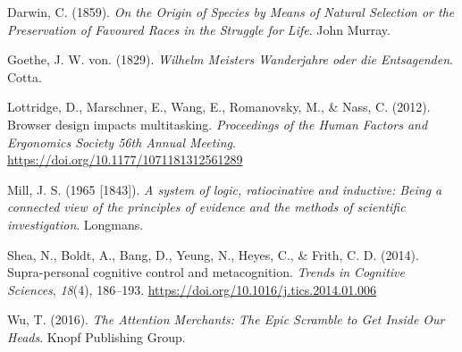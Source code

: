 \documentclass[a4paper, nobind]{templates/ociamthesis}
\newlength{\cslhangindent}
\newenvironment{CSLReferences}[2] %
 {%
  \setlength{\parindent}{0pt}
  \ifodd #1
  \let\oldpar\par
  \def\par{\hangindent=\cslhangindent\oldpar}
  \fi
  \setlength{\parskip}{1mm}
  \setlength{\baselineskip}{6mm}
 }%
 {}
\begin{document}
\hypertarget{refs}{}
\begin{CSLReferences}{1}{0}
\leavevmode{}%
Darwin, C. (1859). \emph{{On the Origin of Species by Means of Natural Selection or the Preservation of Favoured Races in the Struggle for Life}}. John Murray.

\leavevmode{}%
Goethe, J. W. von. (1829). \emph{Wilhelm {Meisters} {Wanderjahre} oder die {Entsagenden}}. Cotta.

\leavevmode{}%
Lottridge, D., Marschner, E., Wang, E., Romanovsky, M., \& Nass, C. (2012). {Browser design impacts multitasking}. \emph{Proceedings of the Human Factors and Ergonomics Society 56th Annual Meeting}. \url{https://doi.org/10.1177/1071181312561289}

\leavevmode{}%
Mill, J. S. (1965 {[}1843{]}). \emph{A system of logic, ratiocinative and inductive: Being a connected view of the principles of evidence and the methods of scientific investigation}. Longmans.

\leavevmode{}%
Shea, N., Boldt, A., Bang, D., Yeung, N., Heyes, C., \& Frith, C. D. (2014). {Supra-personal cognitive control and metacognition}. \emph{Trends in Cognitive Sciences}, \emph{18}(4), 186--193. \url{https://doi.org/10.1016/j.tics.2014.01.006}

\leavevmode{}%
Wu, T. (2016). \emph{{The Attention Merchants: The Epic Scramble to Get Inside Our Heads}}. Knopf Publishing Group.

\end{CSLReferences}

\end{document}
